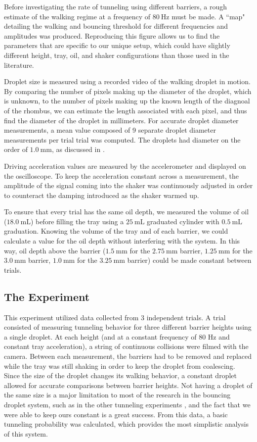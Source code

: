 Before investigating the rate of tunneling using different barriers, a rough estimate of the walking regime at a frequency of $80~\mathrm{Hz}$ must be made. A ``map" detailing the walking and bouncing threshold for different frequencies and amplitudes was produced. Reproducing this figure allows us to find the parameters that are specific to our unique setup, which could have slightly different height, tray, oil, and shaker configurations than those used in the literature. 

Droplet size is measured using a recorded video of the walking droplet in motion. By comparing the number of pixels making up the diameter of the droplet, which is unknown, to the number of pixels making up the known length of the diagnoal of the rhombus, we can estimate the length associated with each pixel, and thus find the diameter of the droplet in millimeters. For accurate droplet diameter measurements, a mean value composed of 9 separate  droplet diameter measurements per trial trial was computed. The droplets had diameter on the order of $1.0~\mathrm{mm}$, as discussed in . 

Driving acceleration values are measured by the accelerometer and displayed on the oscilloscope. To keep the acceleration constant across a measurement, the amplitude of the signal coming into the shaker was continuously adjusted in order to counteract the damping introduced as the shaker warmed up.

To ensure that every trial has the same oil depth, we measured the volume of oil ($18.0~\mathrm{mL}$) before filling the tray using a $25~\mathrm{mL}$ graduated cylinder with $0.5~\mathrm{mL}$ graduation. Knowing the volume of the tray and of each barrier, we could calculate a value for the oil depth without interfering with the system. In this way, oil depth above the barrier ($1.5~\mathrm{mm}$ for the $2.75~\mathrm{mm}$ barrier, $1.25~\mathrm{mm}$ for the $3.0~\mathrm{mm}$ barrier, $1.0~\mathrm{mm}$ for the $3.25~\mathrm{mm}$ barrier) could be made constant between trials. 

\subsection{The Experiment}

This experiment utilized data collected from 3 independent trials. A trial consisted of measuring tunneling behavior for three different barrier heights using a single droplet. At each height (and at a constant frequency of 80 Hz and constant tray acceleration), a string of continuous collisions were filmed with the camera. Between each measurement, the barriers had to be removed and replaced while the tray was still shaking in order to keep the droplet from coalescing. Since the size of the droplet changes its walking behavior, a constant droplet allowed for accurate comparisons between barrier heights. Not having a droplet of the same size is a major limitation to most of the research in the bouncing droplet system, such as in the other tunneling experiments \cite{tunneling}, and the fact that we were able to keep ours constant is a great success. From this data, a basic tunneling probability was calculated, which provides the most simplistic analysis of this system. 

